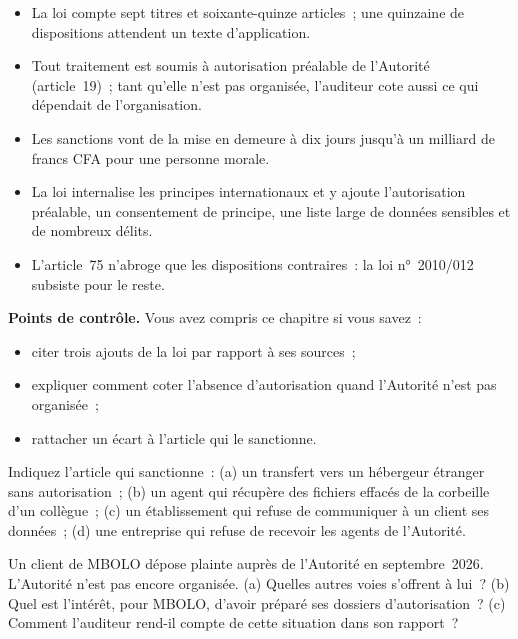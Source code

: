 \begin{boxresume}
\begin{itemize}
    \item La loi compte sept titres et soixante-quinze articles~; une
          quinzaine de dispositions attendent un texte d'application.
    \item Tout traitement est soumis à autorisation préalable de
          l'Autorité (article~19)~; tant qu'elle n'est pas organisée,
          l'auditeur cote aussi ce qui dépendait de l'organisation.
    \item Les sanctions vont de la mise en demeure à dix jours jusqu'à un
          milliard de francs CFA pour une personne morale.
    \item La loi internalise les principes internationaux et y ajoute
          l'autorisation préalable, un consentement de principe, une liste
          large de données sensibles et de nombreux délits.
    \item L'article~75 n'abroge que les dispositions contraires~: la loi
          n°~2010/012 subsiste pour le reste.
\end{itemize}
\end{boxresume}

\begin{boxinfo}
\textbf{Points de contrôle.} Vous avez compris ce chapitre si vous savez~:
\begin{itemize}
    \item citer trois ajouts de la loi par rapport à ses sources~;
    \item expliquer comment coter l'absence d'autorisation quand l'Autorité
          n'est pas organisée~;
    \item rattacher un écart à l'article qui le sanctionne.
\end{itemize}
\end{boxinfo}

\begin{boxexo}[title={\ding{45}\quad Exercice~6.1. Quel article \niveaubase}]
Indiquez l'article qui sanctionne~: (a) un transfert vers un hébergeur
étranger sans autorisation~; (b) un agent qui récupère des fichiers
effacés de la corbeille d'un collègue~; (c) un établissement qui refuse de
communiquer à un client ses données~; (d) une entreprise qui refuse de
recevoir les agents de l'Autorité.
\end{boxexo}

\begin{boxexo}[title={\ding{45}\quad Exercice~6.2. Sans Autorité \niveauexpert}]
Un client de MBOLO dépose plainte auprès de l'Autorité en septembre~2026.
L'Autorité n'est pas encore organisée. (a) Quelles autres voies s'offrent
à lui~? (b) Quel est l'intérêt, pour MBOLO, d'avoir préparé ses dossiers
d'autorisation~? (c) Comment l'auditeur rend-il compte de cette
situation dans son rapport~?
\end{boxexo}

